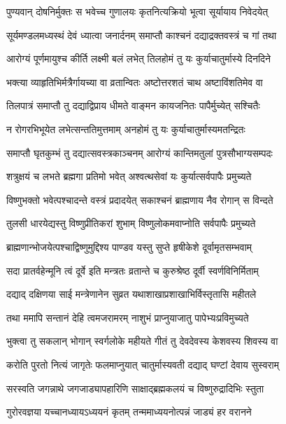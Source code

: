 \twolineshloka
{पुण्यवान् दोषनिर्मुक्तः स भवेच्च गुणालयः}
{कृतनित्यक्रियो भूत्वा सूर्यायाय निवेदयेत्} %

\twolineshloka
{सूर्यमण्डलमध्यस्थं देवं ध्यात्वा जनार्दनम्}
{समाप्तौ काश्चनं दद्याद्रक्तवस्त्रं च गां तथा} %

\twolineshloka
{आरोग्यं पूर्णमायुश्च कीर्ति लक्ष्मी बलं लभेत्}
{तिलहोमं तु यः कुर्याचातुर्मास्ये दिनदिने} %

\twolineshloka
{भक्त्या व्याहृतिभिर्मत्रैर्गायच्या वा व्रतान्वितः}
{अष्टोत्तरशतं चाथ अष्टाविंशतिमेव वा} %

\twolineshloka
{तिलपात्रं समाप्तौ तु दद्याद्विप्राय धीमते}
{वाङ्मन कायजनितः पापैर्मुच्येत् सश्चितैः} %

\twolineshloka
{न रोगरभिभूयेत लभेत्सन्ततिमुत्तमाम्}
{अनहोमं तु यः कुर्याचातुर्मास्यमतन्द्रितः} %

\twolineshloka
{समाप्तौ घृतकुम्भं तु दद्यात्सवस्त्रकाञ्चनम्}
{आरोग्यं कान्तिमतुलां पुत्रसौभाग्यसम्पदः} %

\twolineshloka
{शत्रुक्षयं च लभते ब्रह्मगा प्रतिमो भवेत्}
{अश्वत्थसेवां यः कुर्यात्सर्वपापैः प्रमुच्यते} %

\twolineshloka
{विष्णुभक्तो भवेत्पश्चादन्ते वस्त्रं प्रदादयेत्}
{सकाश्चनं ब्राह्मणाय नैव रोगान् स विन्दते} %

\twolineshloka
{तुलसी धारयेद्यस्तु विष्णुप्रीतिकरां शुभाम्}
{विष्णुलोकमवाप्नोति सर्वपापैः प्रमुच्यते} %

\twolineshloka
{ब्राह्मणान्भोजयेत्पश्चाद्विष्णुमुद्दिश्य पाण्डव}
{यस्तु सुप्ते हृषीकेशे दूर्वामृतसम्भवाम्} %

\twolineshloka
{सदा प्रातर्वहेन्मूनि त्वं दूर्वे इति मन्त्रतः}
{व्रतान्ते च कुरुश्रेष्ठ दूर्वी स्वर्णविनिर्मिताम्} %

\twolineshloka
{दद्याद् दक्षिणया साई मन्त्रेणानेन सुव्रत}
{यथाशाखाप्रशाखाभिर्विस्तृतासि महीतले} %

\twolineshloka
{तथा ममापि सन्तानं देहि त्वमजरामरम्}
{नाशुभं प्राप्नुयाजातु पापेभ्यःप्रविमुच्यते} %

\twolineshloka
{भुक्त्वा तु सकलान् भोगान् स्वर्गलोके महीयते}
{गीतं तु देवदेवस्य केशवस्य शिवस्य वा} %

\twolineshloka
{करोति पुरतो नित्यं जागृतेः फलमाप्नुयात्}
{चातुर्मास्यवती दद्याद् घण्टां देवाय सुस्वराम्} %

\twolineshloka
{सरस्वति जगन्नाथे जगजाड्यापहारिणि}
{साक्षाद्ब्रह्मकलयं च विष्णुरुद्रादिभिः स्तुता} %

\twolineshloka
{गुरोरवज्ञया यच्चानध्यायऽध्ययनं कृतम्}
{तन्ममाध्ययनोत्पन्नं जाड्यं हर वरानने} %

